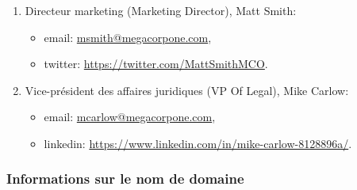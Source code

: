 \documentclass[french,paper=a4,oneside,captions=tableheading]{article}
\begin{document}
\begin{enumerate}
\begin{itemize}
    \end{itemize}
    \item Directeur marketing (Marketing Director), Matt Smith:
    \begin{itemize}
        \item email: \url{msmith@megacorpone.com},
        \item twitter: \url{https://twitter.com/MattSmithMCO}.
    \end{itemize}
    \item Vice-président des affaires juridiques (VP Of Legal), Mike Carlow:
    \begin{itemize}
        \item email: \url{mcarlow@megacorpone.com},
        \item linkedin: \url{https://www.linkedin.com/in/mike-carlow-8128896a/}.
    \end{itemize}
\end{enumerate}



\subsubsection{Informations sur le nom de domaine}
\end{document}
